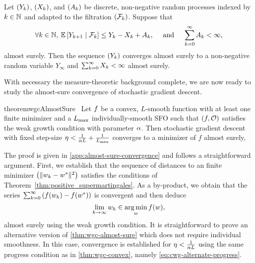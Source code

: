 \begin{theorem}\label{thm:positive_supermartingales}
    Let \( \seq{Y_\iter} \), \( \seq{X_\iter} \), and \( \seq{A_\iter} \) be discrete, non-negative random processes indexed by \( \iter \in \bbN \) and adapted to the filtration \( \seq{\calF_\iter} \).
    Suppose that
    \begin{align*}
        \forall \iter \in \bbN, \: \E \sbr{Y_{\iter+1} \mid \calF_\iter} \leq Y_\iter - X_\iter + A_\iter,
        \quad \text{ and } \quad 
        \sum_{k=0}^{\infty} A_\iter < \infty,
    \end{align*}
    almost surely.
    Then the sequence \( \seq{Y_\iter} \) converges almost surely to a non-negative random variable \( Y_\infty \) and \( \sum_{k=0}^{\infty} X_\iter < \infty \) almost surely.
\end{theorem}
\noindent With necessary the measure-theoretic background complete, we are now ready to study the almost-sure convergence of stochastic gradient descent.

\begin{restatable}{theorem}{wgcAlmostSure}~\label{thm:wgc-almost-sure}
    Let \( \f \) be a convex, \( L \)-smooth function with at least one finite minimizer and \oracle{} a \( \Lmax \) individually-smooth \ac{SFO} such that \( \rbr{f, \oracle{}} \) satisfies the weak growth condition with parameter \( \wgc \).
    Then stochastic gradient descent with fixed step-size \( \eta < \frac{1}{\wgc L} + \frac{1}{\Lmax} \) converges to a minimizer of \( f \) almost surely,
\end{restatable}

The proof is given in \autoref{app:almost-sure-convergence} and follows a straightforward argument.
First, we establish that the sequence of distances to an  finite minimizer \( \seq{\norm{\wk - \wopt}^2} \) satisfies the conditions of Theorem~\ref{thm:positive_supermartingales}.
As a by-product, we obtain that the series \( \sum_{k=0}^{\infty} \rbr{f(\wk) - f(\wopt)} \) is convergent  and then deduce
\[ \lim_{k\rightarrow\infty} \wk \in \argmin_w f(\w), \] 
almost surely using the weak growth condition.
It is straightforward to prove an alternative version of \autoref{thm:wgc-almost-sure} which does not require individual smoothness.
In this case, convergence is established for \( \eta < \frac{1}{\wgc L} \) using the same progress condition as in \autoref{thm:wgc-convex}, namely \autoref{eq:cwg-alternate-progress}.

